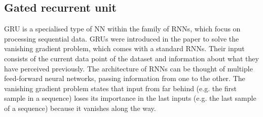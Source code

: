 \subsection{Gated recurrent unit}
\label{sub:Gated-Recurrent-Unit}
\Gls{GRU} is a specialised type of \gls{NN} within the family of \glspl{RNN}, which focus on processing sequential data. \glspl{GRU} were introduced in the paper \cite{cho_learning_2014} to solve the vanishing gradient problem, which comes with a standard \glspl{RNN}. Their input consists of the current data point of the dataset and information about what they have perceived previously. The architecture of \glspl{RNN} can be thought of multiple feed-forward neural networks, passing information from one to the other. The vanishing gradient problem states that input from far behind (e.g. the first sample in a sequence) loses its importance in the last inputs (e.g. the last sample of a sequence) because it vanishes along the way.

